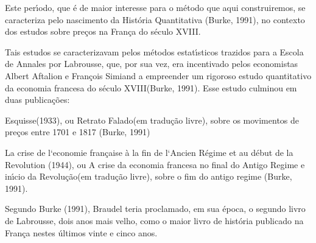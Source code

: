 \documentclass[
12pt,		%
openright,	%
twoside,  %
a4paper,			%
chapter=TITLE,		%
english,			%
french,				%
spanish,			%
brazil				%
]{USPSC-classe/USPSC}
\begin{document}
Este per\'{\i}odo, que \'e de maior interesse para o m\'etodo que aqui construiremos, se caracteriza pelo nascimento da Hist\'oria Quantitativa (Burke, 1991), no contexto dos estudos sobre pre\c{c}os na Fran\c{c}a do s\'eculo XVIII.

















Tais estudos se caracterizavam pelos m\'etodos estat\'{\i}sticos trazidos para a Escola de Annales por Labrousse, que, por sua vez, era \textquotedbl incentivado pelos economistas Albert Aftalion e Fran\c{c}ois Simiand a empreender um rigoroso estudo quantitativo da economia francesa do s\'eculo XVIII\textquotedbl   (Burke, 1991). Esse estudo culminou em duas publica\c{c}\~oes:


















\begin{alineas}
\item \textquotedbl Esquisse\textquotedbl  (1933), ou \textquotedbl Retrato Falado\textquotedbl  (em tradu\c{c}\~ao livre), sobre os movimentos de pre\c{c}os entre 1701 e 1817  (Burke, 1991)
\item La crise de l`economie fran\c{c}aise \`a la fin de l`Ancien R\'egime et au d\'ebut de la Revolution (1944), ou \textquotedbl A crise da economia francesa no final do Antigo Regime e in\'{\i}cio da Revolu\c{c}\~ao\textquotedbl  (em tradu\c{c}\~ao livre), sobre o fim do antigo regime  (Burke, 1991).

\end{alineas}

Segundo  Burke (1991), Braudel teria proclamado, em sua \'epoca, o segundo livro de Labrousse, dois anos mais velho, como \textquotedbl o maior livro de hist\'oria publicado na Fran\c{c}a nestes \'ultimos vinte e cinco anos\textquotedbl .
\end{document}
